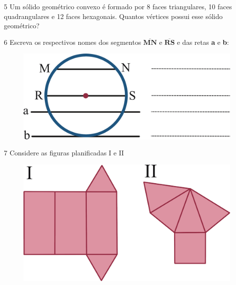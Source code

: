 \num{5} Um sólido geométrico convexo é formado por 8 faces triangulares, 10
faces quadrangulares e 12 faces hexagonais. Quantos vértices possui esse
sólido geométrico?

\begin{emptybox}
\end{emptybox}

\pagebreak
\num{6} Escreva os respectivos nomes dos segmentos
$\overline{\mathbf{\text{MN}}}$ e $\overline{\mathbf{\text{RS}}}$ e
das retas \textbf{a} e \textbf{b}:

\begin{figure}[htpb!]
\centering
\includegraphics[width=\textwidth]{./ilustras-mat/modulo_10-atividade_6.png}
\end{figure}


\num{7} Considere as figuras planificadas I e II

\begin{figure}[htpb!]
\centering
\includegraphics[width=\textwidth]{./ilustras-mat/modulo_10-atividade_7.png}
\end{figure}

